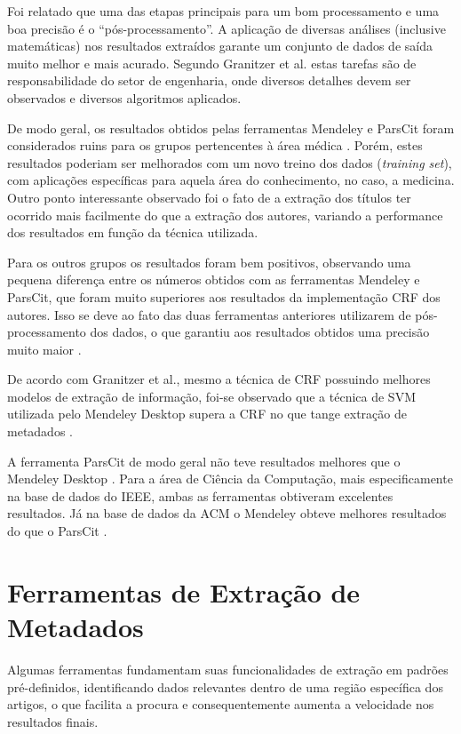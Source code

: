 Foi relatado que uma das etapas principais para um bom processamento e uma boa precisão é o ``pós-processamento''. A aplicação de diversas análises (inclusive matemáticas) nos resultados extraídos garante um conjunto de dados de saída muito melhor e mais acurado. Segundo Granitzer et al. \cite{Granitzer-2012-LayoutBased} estas tarefas são de responsabilidade do setor de engenharia, onde diversos detalhes devem ser observados e diversos algoritmos aplicados.

De modo geral, os resultados obtidos pelas ferramentas Mendeley e ParsCit foram considerados ruins para os grupos pertencentes à área médica \cite{Granitzer-2012-LayoutBased}. Porém, estes resultados poderiam ser melhorados com um novo treino dos dados (\emph{training set}), com aplicações específicas para aquela área do conhecimento, no caso, a medicina. Outro ponto interessante observado \cite{Granitzer-2012-LayoutBased} foi o fato de a extração dos títulos ter ocorrido mais facilmente do que a extração dos autores, variando a performance dos resultados em função da técnica utilizada.

Para os outros grupos os resultados foram bem positivos, observando uma pequena diferença entre os números obtidos com as ferramentas Mendeley e ParsCit, que foram muito superiores aos resultados da implementação CRF dos autores. Isso se deve ao fato das duas ferramentas anteriores utilizarem de pós-processamento dos dados, o que garantiu aos resultados obtidos uma precisão muito maior \cite{Granitzer-2012-LayoutBased}.

De acordo com Granitzer et al., mesmo a técnica de CRF possuindo melhores modelos de extração de informação, foi-se observado que a técnica de SVM utilizada pelo Mendeley Desktop supera a CRF no que tange extração de metadados \cite{Granitzer-2012-LayoutBased}.

A ferramenta ParsCit de modo geral não teve resultados melhores que o Mendeley Desktop \cite{Granitzer-2012-LayoutBased}. Para a área de Ciência da Computação, mais especificamente na base de dados do IEEE, ambas as ferramentas obtiveram excelentes resultados. Já na base de dados da ACM o Mendeley obteve melhores resultados do que o ParsCit \cite{Granitzer-2012-LayoutBased}.

\section{Ferramentas de Extração de Metadados}
\label{sec:environments}

Algumas ferramentas fundamentam suas funcionalidades de extração em padrões pré-definidos, identificando dados relevantes dentro de uma região específica dos artigos, o que facilita a procura e consequentemente aumenta a velocidade nos resultados finais.

